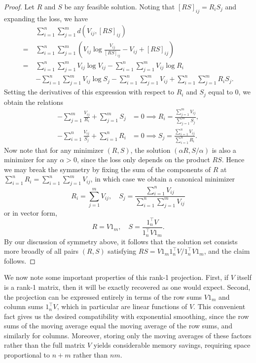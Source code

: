 \documentclass{article}
\begin{document}
\begin{proof}
Let $R$ and $S$ be any feasible solution. Noting that $[RS]_{ij} = R_i S_j$ and expanding the loss, we have
\begin{align*}
& \sum_{i=1}^n \sum_{j=1}^m d(V_{ij}, [RS]_{ij}) \\
= \; & \sum_{i=1}^n \sum_{j=1}^m \left( V_{ij} \log \frac{V_{ij}}{[RS]_{ij}} - V_{ij} + [RS]_{ij} \right) \\
= \; & \sum_{i=1}^n \sum_{j=1}^m V_{ij} \log V_{ij} - \sum_{i=1}^n \sum_{j=1}^m V_{ij} \log R_i \\
& - \sum_{i=1}^n \sum_{j=1}^m V_{ij} \log S_j - \sum_{i=1}^n \sum_{j=1}^m V_{ij} + \sum_{i=1}^n \sum_{j=1}^m R_i S_j .
\end{align*}
Setting the derivatives of this expression with respect to $R_i$ and $S_j$ equal to 0, we obtain the relations
\begin{align*}
- \sum_{j=1}^m \frac{V_{ij}}{R_i} + \sum_{j=1}^m S_j & = 0 \implies R_i = \frac{\sum_{j=1}^m V_{ij}}{\sum_{j=1}^m S_j} , \\
- \sum_{i=1}^n \frac{V_{ij}}{S_j} + \sum_{i=1}^n R_i & = 0 \implies S_j = \frac{\sum_{i=1}^n V_{ij}}{\sum_{i=1}^n R_i} .
\end{align*}
Now note that for any minimizer $(R, S)$, the solution $(\alpha R, S / \alpha)$ is also a minimizer for any $\alpha > 0$, since the loss only depends on the product $R S$. Hence we may break the symmetry by fixing the sum of the components of $R$ at $\sum_{i=1}^n R_i = \sum_{i=1}^n \sum_{j=1}^m V_{ij}$, in which case we obtain a canonical minimizer $$R_i = \sum_{j=1}^m V_{ij}, \quad S_j = \frac{\sum_{i=1}^n V_{ij}}{\sum_{i=1}^n \sum_{j=1}^m V_{ij}}$$ or in vector form, $$R = V 1_m, \quad S = \frac{1_n^\top V}{1_n^\top V 1_m}.$$ By our discussion of symmetry above, it follows that the solution set consists more broadly of all pairs $(R, S)$ satisfying $R S = V 1_m 1_n^\top V / 1_n^\top V 1_m$, and the claim follows.
\end{proof}

We now note some important properties of this rank-1 projection. First, if $V$ itself is a rank-1 matrix, then it will be exactly recovered as one would expect. Second, the projection can be expressed entirely in terms of the row sums $V 1_m$ and column sums $1_n^\top V$, which in particular are linear functions of $V$. This convenient fact gives us the desired compatibility with exponential smoothing, since the row sums of the moving average equal the moving average of the row sums, and similarly for columns. Moreover, storing only the moving averages of these factors rather than the full matrix $V$ yields considerable memory savings, requiring space proportional to $n + m$ rather than $n m$.
\end{document}
